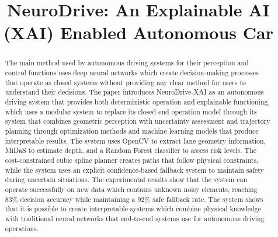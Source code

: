\documentclass[conference]{IEEEtran}
\begin{document}
\title{NeuroDrive: An Explainable AI (XAI) Enabled Autonomous Car}

\author{
\and
{}
\and
{}
\and
{}
}

\maketitle

\begin{abstract}
The main method used by autonomous driving systems for their perception and control functions uses deep neural networks which create decision-making processes that operate as closed systems without providing any clear method for users to understand their decisions. The paper introduces NeuroDrive-XAI as an autonomous driving system that provides both deterministic operation and explainable functioning, which uses a modular system to replace its closed-end operation model through its system that combines geometric perception with uncertainty assessment and trajectory planning through optimization methods and machine learning models that produce interpretable results. The system uses OpenCV to extract lane geometry information, MiDaS to estimate depth, and a Random Forest classifier to assess risk levels. The cost-constrained cubic spline planner creates paths that follow physical constraints, while the system uses an explicit confidence-based fallback system to maintain safety during uncertain situations. The experimental results show that the system can operate successfully on new data which contains unknown noisy elements, reaching 83\% decision accuracy while maintaining a 92\% safe fallback rate. The system shows that it is possible to create interpretable systems which combine physical knowledge with traditional neural networks that end-to-end systems use for autonomous driving operations.
\end{abstract}
\end{document}
